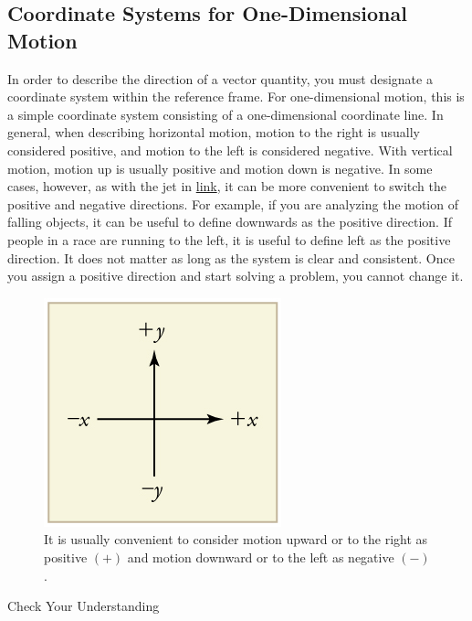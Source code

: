 \documentclass[
]{book}
\begin{document}
\hypertarget{fs-id1655694}{}
\hypertarget{coordinate-systems-for-one-dimensional-motion}{%
\subsection{Coordinate Systems for One-Dimensional Motion}\label{coordinate-systems-for-one-dimensional-motion}}

In order to describe the direction of a vector quantity, you must
designate a coordinate system within the reference frame. For
one-dimensional motion, this is a simple coordinate system consisting of
a one-dimensional coordinate line. In general, when describing
horizontal motion, motion to the right is usually considered positive,
and motion to the left is considered negative. With vertical motion,
motion up is usually positive and motion down is negative. In some
cases, however, as with the jet in
\protect\hyperlink{import-auto-id1778274}{link}, it can be more
convenient to switch the positive and negative directions. For example,
if you are analyzing the motion of falling objects, it can be useful to
define downwards as the positive direction. If people in a race are
running to the left, it is useful to define left as the positive
direction. It does not matter as long as the system is clear and
consistent. Once you assign a positive direction and start solving a
problem, you cannot change it.

\begin{figure}
\hypertarget{import-auto-id1758074}{%
\centering
\includegraphics{images/Figure_02_02_00b.jpg}
\caption{It is usually convenient to consider motion upward or to the right as
positive \({( + )}{}\) and motion downward or to the left as negative
\({( - )}{}\).}\label{import-auto-id1758074}
}
\end{figure}

\hypertarget{fs-id1788025}{}
Check Your Understanding
\end{document}
